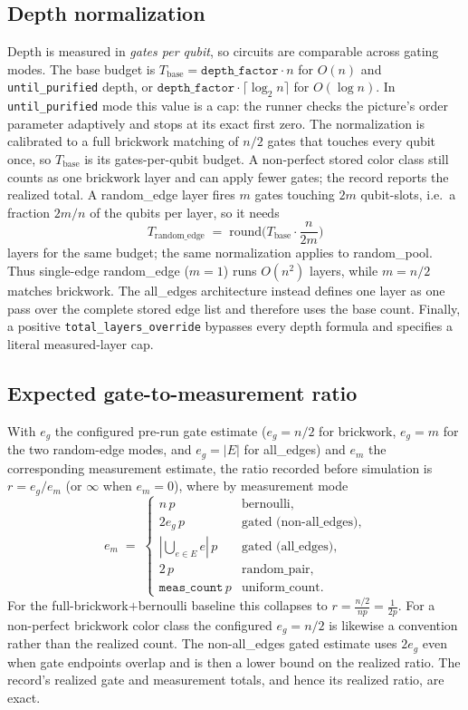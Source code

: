 \documentclass[11pt]{article}
\theoremstyle{definition}
\theoremstyle{plain}
\begin{document}
\subsection{Depth normalization}
\label{sec:depth}
Depth is measured in \emph{gates per qubit}, so circuits are comparable across
gating modes. The base budget is $T_{\mathrm{base}}=\texttt{depth\_factor}\cdot n$
for $O(n)$ and \texttt{until\_purified} depth, or
$\texttt{depth\_factor}\cdot\lceil\log_2 n\rceil$ for $O(\log n)$. In
\texttt{until\_purified} mode this value is a cap: the runner checks the
picture's order parameter adaptively and stops at its exact first zero. The
normalization is calibrated to a full brickwork matching of $n/2$ gates that
touches every qubit once, so $T_{\mathrm{base}}$ is its gates-per-qubit budget.
A non-perfect stored color class still counts as one brickwork layer and can
apply fewer gates; the record reports the realized total. A random\_edge layer
fires $m$ gates touching $2m$ qubit-slots, i.e.\ a fraction $2m/n$ of the qubits
per layer, so it needs
\begin{equation}
\label{eq:depthnorm}
  T_{\mathrm{random\_edge}} \;=\; \mathrm{round}\!\Big(T_{\mathrm{base}}\cdot\frac{n}{2m}\Big)
\end{equation}
layers for the same budget; the same normalization applies to random\_pool.
Thus single-edge random\_edge ($m=1$) runs $O(n^2)$ layers, while $m=n/2$
matches brickwork. The all\_edges architecture instead defines one layer as one
pass over the complete stored edge list and therefore uses the base count.
Finally, a positive \texttt{total\_layers\_override} bypasses every depth formula
and specifies a literal measured-layer cap.

\subsection{Expected gate-to-measurement ratio}
With $e_g$ the configured pre-run gate estimate ($e_g=n/2$ for brickwork,
$e_g=m$ for the two random-edge modes, and $e_g=|E|$ for all\_edges) and $e_m$
the corresponding measurement estimate, the ratio recorded before simulation
is $r=e_g/e_m$ (or $\infty$ when $e_m=0$), where by measurement mode
\begin{equation}
  e_m \;=\;
  \begin{cases}
    n\,p & \text{bernoulli},\\
    2e_g\,p & \text{gated (non-all\_edges)},\\
    |\bigcup_{e\in E}e|\,p & \text{gated (all\_edges)},\\
    2\,p & \text{random\_pair},\\
    \texttt{meas\_count}\,p & \text{uniform\_count}.
  \end{cases}
\end{equation}
For the full-brickwork$+$bernoulli baseline this collapses to
$r=\tfrac{n/2}{np}=\tfrac1{2p}$. For a non-perfect brickwork color class the
configured $e_g=n/2$ is likewise a convention rather than the realized count.
The non-all\_edges gated estimate uses $2e_g$ even when gate endpoints overlap
and is then a lower bound on the realized ratio. The record's realized gate and
measurement totals, and hence its realized ratio, are exact.
\end{document}

